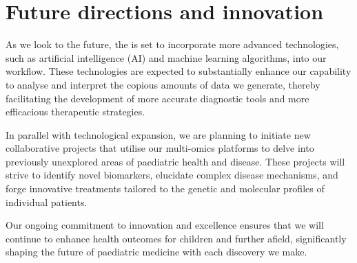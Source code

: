 \section{Future directions and innovation}

As we look to the future, the \pmu is set to incorporate more advanced technologies, such as artificial intelligence (AI) and machine learning algorithms, into our workflow. These technologies are expected to substantially enhance our capability to analyse and interpret the copious amounts of data we generate, thereby facilitating the development of more accurate diagnostic tools and more efficacious therapeutic strategies.

In parallel with technological expansion, we are planning to initiate new collaborative projects that utilise our multi-omics platforms to delve into previously unexplored areas of paediatric health and disease. These projects will strive to identify novel biomarkers, elucidate complex disease mechanisms, and forge innovative treatments tailored to the genetic and molecular profiles of individual patients.

Our ongoing commitment to innovation and excellence ensures that we will continue to enhance health outcomes for children and further afield, significantly shaping the future of paediatric medicine with each discovery we make.
